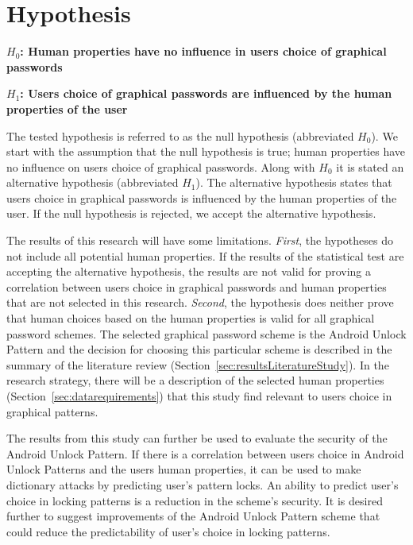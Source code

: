 \section{Hypothesis} \label{sec:hypothesis}
    
  {\bf $H_{0}$: Human properties have no influence in users choice of graphical passwords} 

  {\bf $H_{1}$: Users choice of graphical passwords are influenced by the human properties of the user}

  The tested hypothesis is referred to as the null hypothesis (abbreviated $H_{0}$). We start with the assumption that the null hypothesis is true; human properties have no influence on users choice of graphical passwords. Along with $H_{0}$ it is stated an alternative hypothesis (abbreviated $H_{1}$). The alternative hypothesis states that users choice in graphical passwords is influenced by the human properties of the user. If the null hypothesis is rejected, we accept the alternative hypothesis.

  The results of this research will have some limitations. {\it First}, the hypotheses do not include all potential human properties. If the results of the statistical test are accepting the alternative hypothesis, the results are not valid for proving a correlation between users choice in graphical passwords and human properties that are not selected in this research. 
  {\it Second}, the hypothesis does neither prove that human choices based on the human properties is valid for all graphical password schemes. The selected graphical password scheme is the Android Unlock Pattern and the decision for choosing this particular scheme is described in the summary of the literature review (Section~\ref{sec:resultsLiteratureStudy}). 
  In the research strategy, there will be a description of the selected human properties (Section~\ref{sec:datarequirements}) that this study find relevant to users choice in graphical patterns.
  
  The results from this study can further be used to evaluate the security of the Android Unlock Pattern. If there is a correlation between users choice in Android Unlock Patterns and the users human properties, it can be used to make dictionary attacks by predicting user's pattern locks. An ability to predict user's choice in locking patterns is a reduction in the scheme's security. It is desired further to suggest improvements of the Android Unlock Pattern scheme that could reduce the predictability of user's choice in locking patterns.

